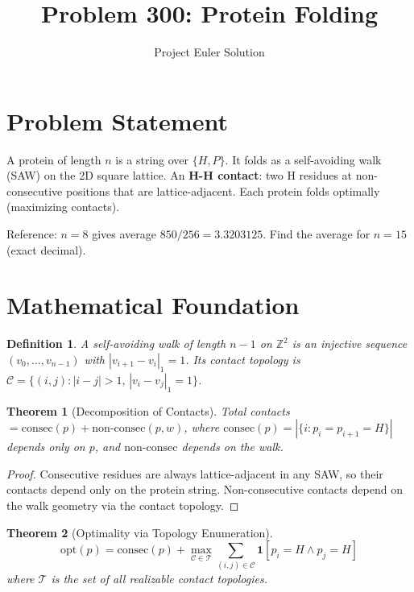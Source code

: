 \documentclass[12pt]{article}
\title{Problem 300: Protein Folding}
\author{Project Euler Solution}
\date{}
\newtheorem{theorem}{Theorem}
\newtheorem{definition}{Definition}
\begin{document}
\maketitle

\section{Problem Statement}
A protein of length $n$ is a string over $\{H, P\}$. It folds as a self-avoiding walk (SAW) on the 2D square lattice. An \textbf{H-H contact}: two H residues at non-consecutive positions that are lattice-adjacent. Each protein folds optimally (maximizing contacts).

Reference: $n = 8$ gives average $850/256 = 3.3203125$. Find the average for $n = 15$ (exact decimal).

\section{Mathematical Foundation}

\begin{definition}
A \emph{self-avoiding walk} of length $n-1$ on $\mathbb{Z}^2$ is an injective sequence $(v_0, \ldots, v_{n-1})$ with $|v_{i+1} - v_i|_1 = 1$. Its \emph{contact topology} is $\mathcal{C} = \{(i,j) : |i-j| > 1,\, |v_i - v_j|_1 = 1\}$.
\end{definition}

\begin{theorem}[Decomposition of Contacts]
Total contacts $= \mathrm{consec}(p) + \mathrm{non\text{-}consec}(p, w)$, where $\mathrm{consec}(p) = |\{i : p_i = p_{i+1} = H\}|$ depends only on $p$, and $\mathrm{non\text{-}consec}$ depends on the walk.
\end{theorem}

\begin{proof}
Consecutive residues are always lattice-adjacent in any SAW, so their contacts depend only on the protein string. Non-consecutive contacts depend on the walk geometry via the contact topology.
\end{proof}

\begin{theorem}[Optimality via Topology Enumeration]
\[
\mathrm{opt}(p) = \mathrm{consec}(p) + \max_{\mathcal{C} \in \mathcal{T}} \sum_{(i,j) \in \mathcal{C}} \mathbf{1}[p_i = H \wedge p_j = H]
\]
where $\mathcal{T}$ is the set of all realizable contact topologies.
\end{theorem}
\end{document}
